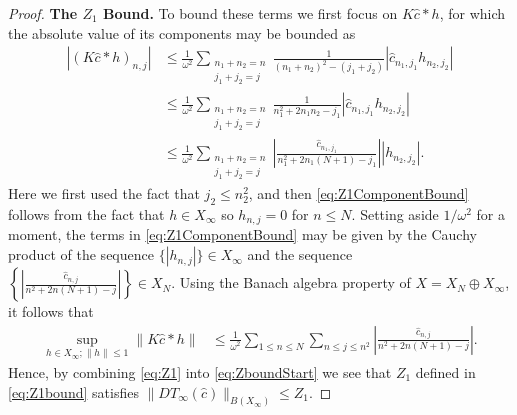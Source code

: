 \documentclass{article}
\newcommand{\cTrunc}{\hat{c}}
\begin{document}
\begin{proof}
\textbf{The $Z_1$ Bound.} 
To bound these terms we first focus on $	K \cTrunc * h $, for which the absolute value of its components may be bounded as  
\begin{align}
\left|	(K \cTrunc * h)_{n,j} \right|  &\leq
\frac{1}{\omega^2}
\sum_{\substack{n_1+n_2 =n\\j_1+j_2=j}}  \frac{1}{(n_1+ n_2)^2 - (j_1+j_2)} |\cTrunc_{n_1,j_1} h_{n_2,j_2}|  
\nonumber
\\
&\leq 
\frac{1}{\omega^2}
\sum_{\substack{n_1+n_2 =n\\j_1+j_2=j}}  \frac{1}{n_1^2 +2 n_1 n_2  - j_1} |\cTrunc_{n_1,j_1} h_{n_2,j_2}|
\nonumber
   \\
&\leq 
\frac{1}{\omega^2}
\sum_{\substack{n_1+n_2 =n\\j_1+j_2=j}} 
\left|
\frac{\cTrunc_{n_1,j_1} }{n_1^2 +2 n_1 (N+1)  - j_1}
\right| |h_{n_2,j_2}|	  .
\label{eq:Z1ComponentBound}
\end{align}
Here we first used the fact that   $  j_2 \leq n_2^2$, and   then \eqref{eq:Z1ComponentBound} follows from  the fact that  $ h \in X_\infty$ so $h_{n,j}=0$ for $n \leq N$. 
Setting aside $ 1/\omega^2$ for a moment, the terms in \eqref{eq:Z1ComponentBound} may be given by the Cauchy product of the sequence  $\{ |h_{n,j}|\} \in X_\infty$ and the sequence $\left\{ \left|
\frac{\cTrunc_{n,j} }{n^2 +2 n (N+1)  - j}
\right| \right\} \in X_N$. 
Using the Banach algebra property of $ X = X_N \oplus X_{\infty}$, it follows that  
\begin{align}\label{eq:Z1}
	\sup_{h \in X_\infty; \|h \| \leq 1} 
	\| K \cTrunc * h \| 
	&\leq 
	\frac{1}{\omega^2}
	\sum_{1\leq n \leq N } 
	\sum_{n\leq j \leq n^2}
	\left|
	\frac{\cTrunc_{n,j} }{n^2 +2 n (N+1)  - j}
	\right|
	.
\end{align}
Hence, by combining \eqref{eq:Z1} into  \eqref{eq:ZboundStart} we see that $Z_1$ defined in \eqref{eq:Z1bound} satisfies $
\| DT_\infty(\hat{c})\|_{B(X_\infty)}  \leq Z_1$. 



\end{proof}
\end{document}
